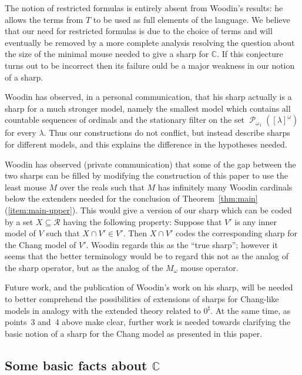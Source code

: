 \documentclass[
twoside,
]{article}
\theoremstyle{definition}
\theoremstyle{remark}
\DeclareMathOperator{\ps}{\mathcal{P}}
\newcommand\reals{\mathcal{R}}
\newcommand\chang{\mathbb{C}}
\begin{document}
\begin{compactenum}
  \setcounter{enumi}{3}
\item 
  The notion of restricted formulas is entirely absent from
  Woodin's results: he allows the  terms from $T$ to be  used as full elements of the
  language.   We believe that our need for restricted formulas is due to
  the choice of terms and will eventually
  be removed by a more complete analysis  resolving the
  question about the size of the minimal mouse needed to give a sharp for $\chang$. 
  If this conjecture turns out to be incorrect then its failure ould be
  a major weakness in our
  notion of a sharp.
\item 
  Woodin has observed, in a personal communication, that his sharp
  actually is a sharp for a much stronger model, namely the smallest model
  which  contains all countable sequences of ordinals and the
  stationary filter on the set $\ps_{\omega_1}([\lambda]^{\omega})$
  for every $\lambda$.   Thus  our constructions do not conflict, but instead
  describe sharps for different models, and this
  explains the difference in the hypotheses needed. 
\end{compactenum}

Woodin has observed (private communication) that some of the gap
between the two sharps can
be filled by modifying the construction of this paper to use the least
mouse $M$ 
over the reals such that $M$ has  infinitely many Woodin cardinals below the 
extenders needed for the conclusion of
Theorem~\ref{thm:main}(\ref{item:main-upper}).   This would
give a version of our sharp which can be coded by a set
$X\subseteq\reals$ having the following property: Suppose that $V'$ is
any inner model of $V$ such that $X\cap V'\in V'$.  Then
$X\cap V'$ codes the corresponding sharp
for the Chang model of $V'$.   Woodin regards this as the ``true
sharp''; however it seems that the better terminology would be to
regard this not as the analog of the sharp operator, but as the analog
of the $M_\omega$ mouse operator.

Future work, and the publication of Woodin's work on his sharp, will
be needed to better comprehend the possibilities of extensions of 
sharps  for Chang-like models in analogy with the
extended theory related to $0^{\sharp}$.  At the same time, as points~3 and~4 above
make clear, further work is needed towards clarifying the basic notion
of a sharp for the Chang model as presented in this paper.

\subsection{Some basic facts about $\chang$}
\label{sec:basic-facts}
\end{document}

